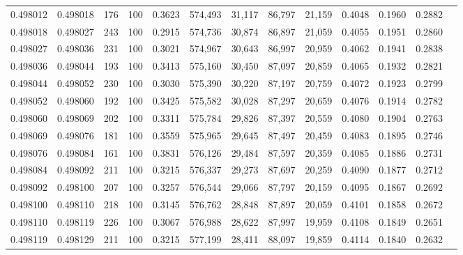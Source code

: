\begin{tabular}{rrrrrrrrrrrrr}
0.498012 & 0.498018 &   176 & 100 &                                     0.3623 & 574,493 &  31,117 &  86,797 &  21,159 & 0.4048 & 0.1960 & 0.2882 \\
0.498018 & 0.498027 &   243 & 100 &                                     0.2915 & 574,736 &  30,874 &  86,897 &  21,059 & 0.4055 & 0.1951 & 0.2860 \\
0.498027 & 0.498036 &   231 & 100 &                                     0.3021 & 574,967 &  30,643 &  86,997 &  20,959 & 0.4062 & 0.1941 & 0.2838 \\
0.498036 & 0.498044 &   193 & 100 &                                     0.3413 & 575,160 &  30,450 &  87,097 &  20,859 & 0.4065 & 0.1932 & 0.2821 \\
0.498044 & 0.498052 &   230 & 100 &                                     0.3030 & 575,390 &  30,220 &  87,197 &  20,759 & 0.4072 & 0.1923 & 0.2799 \\
0.498052 & 0.498060 &   192 & 100 &                                     0.3425 & 575,582 &  30,028 &  87,297 &  20,659 & 0.4076 & 0.1914 & 0.2782 \\
0.498060 & 0.498069 &   202 & 100 &                                     0.3311 & 575,784 &  29,826 &  87,397 &  20,559 & 0.4080 & 0.1904 & 0.2763 \\
0.498069 & 0.498076 &   181 & 100 &                                     0.3559 & 575,965 &  29,645 &  87,497 &  20,459 & 0.4083 & 0.1895 & 0.2746 \\
0.498076 & 0.498084 &   161 & 100 &                                     0.3831 & 576,126 &  29,484 &  87,597 &  20,359 & 0.4085 & 0.1886 & 0.2731 \\
0.498084 & 0.498092 &   211 & 100 &                                     0.3215 & 576,337 &  29,273 &  87,697 &  20,259 & 0.4090 & 0.1877 & 0.2712 \\
0.498092 & 0.498100 &   207 & 100 &                                     0.3257 & 576,544 &  29,066 &  87,797 &  20,159 & 0.4095 & 0.1867 & 0.2692 \\
0.498100 & 0.498110 &   218 & 100 &                                     0.3145 & 576,762 &  28,848 &  87,897 &  20,059 & 0.4101 & 0.1858 & 0.2672 \\
0.498110 & 0.498119 &   226 & 100 &                                     0.3067 & 576,988 &  28,622 &  87,997 &  19,959 & 0.4108 & 0.1849 & 0.2651 \\
0.498119 & 0.498129 &   211 & 100 &                                     0.3215 & 577,199 &  28,411 &  88,097 &  19,859 & 0.4114 & 0.1840 & 0.2632 \\

\end{tabular}
